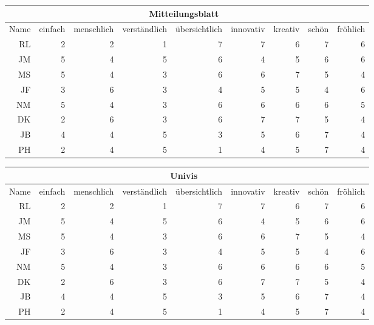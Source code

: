 \documentclass[a4paper,10pt]{scrartcl}
\begin{document}
\begin{center}
\begin{tabular}{r|r|r|r|r|r|r|r|r}
     & \multicolumn{7}{c}{Mitteilungsblatt} \\ \hline
    Name & einfach & menschlich & verständlich & übersichtlich & innovativ & kreativ & schön & fröhlich \\ \hline
    RL & 2 & 2 & 1 & 7 & 7 & 6 & 7 & 6 \\ \hline
    JM & 5 & 4 & 5 & 6 & 4 & 5 & 6 & 6 \\ \hline
    MS & 5 & 4 & 3 & 6 & 6 & 7 & 5 & 4 \\ \hline
    JF & 3 & 6 & 3 & 4 & 5 & 5 & 4 & 6 \\ \hline
    NM & 5 & 4 & 3 & 6 & 6 & 6 & 6 & 5 \\ \hline
    DK & 2 & 6 & 3 & 6 & 7 & 7 & 5 & 4 \\ \hline
    JB & 4 & 4 & 5 & 3 & 5 & 6 & 7 & 4 \\ \hline
    PH & 2 & 4 & 5 & 1 & 4 & 5 & 7 & 4 \\
\end{tabular}
\end{center}

\begin{center}
\begin{tabular}{r|r|r|r|r|r|r|r|r}
     & \multicolumn{7}{c}{Univis} \\ \hline
    Name & einfach & menschlich & verständlich & übersichtlich & innovativ & kreativ & schön & fröhlich \\ \hline
    RL & 2 & 2 & 1 & 7 & 7 & 6 & 7 & 6 \\ \hline
    JM & 5 & 4 & 5 & 6 & 4 & 5 & 6 & 6 \\ \hline
    MS & 5 & 4 & 3 & 6 & 6 & 7 & 5 & 4 \\ \hline
    JF & 3 & 6 & 3 & 4 & 5 & 5 & 4 & 6 \\ \hline
    NM & 5 & 4 & 3 & 6 & 6 & 6 & 6 & 5 \\ \hline
    DK & 2 & 6 & 3 & 6 & 7 & 7 & 5 & 4 \\ \hline
    JB & 4 & 4 & 5 & 3 & 5 & 6 & 7 & 4 \\ \hline
    PH & 2 & 4 & 5 & 1 & 4 & 5 & 7 & 4 \\
\end{tabular}
\end{center}
\end{document}
